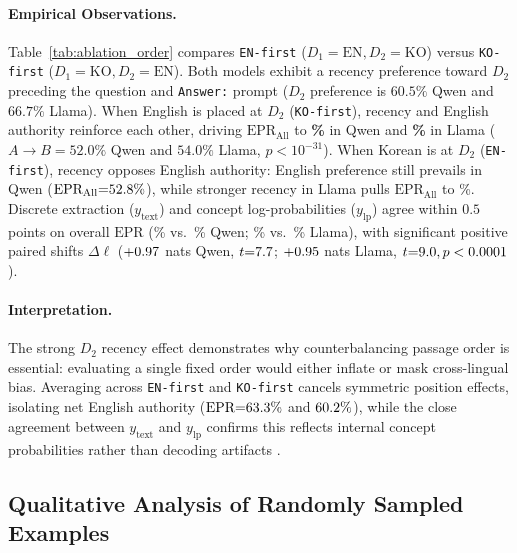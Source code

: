 \paragraph{Empirical Observations.}
Table~\ref{tab:ablation_order} compares \texttt{EN-first} ($D_1{=}\text{EN}, D_2{=}\text{KO}$) versus \texttt{KO-first} ($D_1{=}\text{KO}, D_2{=}\text{EN}$). Both models exhibit a recency preference toward $D_2$ preceding the question and \texttt{Answer:} prompt ($D_2$ preference is $60.5\%$ Qwen and $66.7\%$ Llama). When English is placed at $D_2$ (\texttt{KO-first}), recency and English authority reinforce each other, driving $\text{EPR}_{\text{All}}$ to \textbf{\qwenOrdKOFirstEPRAll\%} in Qwen and \textbf{\llamaOrdKOFirstEPRAll\%} in Llama ($A \to B{=}52.0\%$ Qwen and $54.0\%$ Llama, $p < 10^{-31}$). When Korean is at $D_2$ (\texttt{EN-first}), recency opposes English authority: English preference still prevails in Qwen ($\text{EPR}_{\text{All}}{=}52.8\%$), while stronger recency in Llama pulls $\text{EPR}_{\text{All}}$ to \llamaOrdENFirstEPRAll\%. Discrete extraction ($y_{\text{text}}$) and concept log-probabilities ($y_{\text{lp}}$) agree within $0.5$ points on overall $\text{EPR}$ (\qwenEPRLPAll\% vs.\ \qwenEPRTxtAll\% Qwen; \llamaEPRLPAll\% vs.\ \llamaEPRTxtAll\% Llama), with significant positive paired shifts $\Delta\ell$ ($+0.97$ nats Qwen, $t{=}7.7$; $+0.95$ nats Llama, $t{=}9.0, p < 0.0001$).

\paragraph{Interpretation.}
The strong $D_2$ recency effect demonstrates why counterbalancing passage order is essential: evaluating a single fixed order would either inflate or mask cross-lingual bias. Averaging across \texttt{EN-first} and \texttt{KO-first} cancels symmetric position effects, isolating net English authority ($\text{EPR}{=}63.3\%$ and $60.2\%$), while the close agreement between $y_{\text{text}}$ and $y_{\text{lp}}$ confirms this reflects internal concept probabilities rather than decoding artifacts \citep{qi2025consistency}.

\subsection{Qualitative Analysis of Randomly Sampled Examples}
\label{subsec:qualitative}

